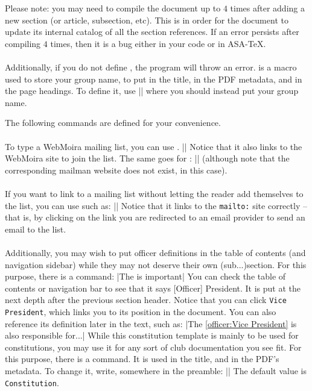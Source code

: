 \documentclass{constitution}
\def\groupname{[Group Name]}
\begin{document}
Please note: you may need to compile the document up to $ 4 $ times after adding a new
section (or article, subsection, etc).
This is in order for the document to update its internal catalog of all the section references.
If an error persists after compiling $ 4 $ times, then it is a bug either in your code or in ASA-\TeX.
\\\\
Additionally, if you do not define \cmdex{\groupname}, the program will throw an error.
\cmdex{\groupname} is a macro used to store your group name, to put in the title, in the PDF metadata, and in the page headings.
To define it, use
\codeex|\def\groupname{Association of Student Activities}|
where you should instead put your group name.

The following commands are defined for your convenience.
\\\\
To type a WebMoira mailing list, you can use \cmdex{\moiralist}.
\coderunex||
Notice that it also links to the WebMoira site to join the list.
The same goes for \cmdex{\mailmanlist}:
\coderunex||
(although note that the corresponding mailman website does not exist, in this case).
\\\\
If you want to link to a mailing list without letting the reader add themselves to the list, you can
    use \cmdex{\mailto} such as:
\coderunex||
Notice that it links to the \verb|mailto:| site correctly -- that is, by clicking on the link you are redirected to an email provider to send an email to the list.
\\\\
Additionally, you may wish to put officer definitions in the table of contents (and navigation sidebar) while they may not deserve their own (sub...)section.
For this purpose, there is a \cmdex{\officer} command:
\coderunex|The  is important|
You can check the table of contents or navigation bar to see that it says [Officer] President.
It is put at the next depth after the previous section header.
Notice that you can click \verb|Vice President|, which links you to its position in the document.
You can also reference its definition later in the text, such as:
\coderunex|The \ref{officer:Vice President} is also responsible for...|
While this constitution template is mainly to be used for constitutions, you may use it for any sort of club documentation you see fit.
For this purpose, there is a \cmdex{\doctype} command.
It is used in the title, and in the PDF's metadata.
To change it, write, somewhere in the preamble:
\codeex|\def\doctype{Your Document Type Here}|
The default value is \verb|Constitution|.
\end{document}
